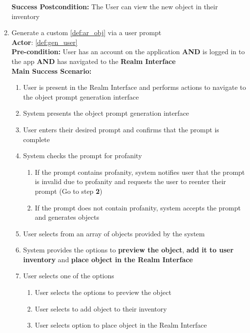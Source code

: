 \documentclass{article}
\begin{document}
\begin{enumerate}[label=\textbf{UC\arabic*}]
\begin{itemize}
        \end{itemize}
        \textbf{Success Postcondition:} The User can view the new object in their inventory

        \item \label{uc:6} Generate a custom \ref{def:ar_obj} via a user prompt \\
        \textbf{Actor}: \ref{def:gen_user} \\
        \textbf{Pre-condition:} User has an account on the application \textbf{AND} is logged in to the app \textbf{AND} has navigated to the \textbf{Realm Interface} \\

        \textbf{Main Success Scenario:}
        \begin{enumerate}[label=\textbf{\arabic*.}]
            \item User is present in the Realm Interface and performs actions to navigate to the object prompt generation interface
            \item System presents the object prompt generation interface
            \item User enters their desired prompt and confirms that the prompt is complete
            \item System checks the prompt for profanity
            \begin{enumerate}[label=(\alph*)]
                \item If the prompt contains profanity, system notifies user that the prompt is invalid due to profanity and requests the user to reenter their prompt (Go to step \textbf{2})
                \item If the prompt does not contain profanity, system accepts the prompt and generates objects
            \end{enumerate}
            \item User selects from an array of objects provided by the system
            \item System provides the options to \textbf{preview the object}, \textbf{add it to user inventory} and \textbf{place object in the Realm Interface}
            \item User selects one of the options
            \begin{enumerate}[label=(\alph*)]
                \item User selects the options to preview the object
                \item User selects to add object to their inventory
                \item User selects option to place object in the Realm Interface

\end{enumerate}
\end{enumerate}
\end{enumerate}
\end{document}

